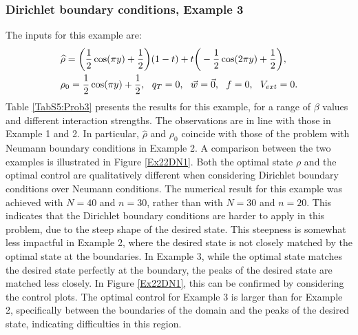 \subsubsection{Dirichlet boundary conditions, Example 3} 
The inputs for this example are:
\begin{align*}
&\widehat \rho = \bigg(\frac{1}{2}\cos(\pi y) + \frac{1}{2}\bigg)(1-t) + t\bigg(-\frac{1}{2}\cos(2 \pi y) + \frac{1}{2}\bigg),\\
&\rho_{0} = \frac{1}{2}\cos(\pi y) + \frac{1}{2},\ \
q_{T} = 0,\ \
\vec{w} = \vec{0},\ \
f =0,\ \
V_{ext} =0.
\end{align*}
Table \ref{TabS5:Prob3} presents the results for this example, for a range of $\beta$ values and different interaction strengths. The observations are in line with those in Example 1 and 2. In particular, $ \widehat \rho$ and $\rho_0$ coincide with those of the problem with Neumann boundary conditions in Example 2. A comparison between the two examples is illustrated in Figure \ref{Ex22DN1}. Both the optimal state $\rho$ and the optimal control are qualitatively different when considering Dirichlet boundary conditions over Neumann conditions. The numerical result for this example was achieved with $N=40$ and $n = 30$, rather than with $N=30$ and $n=20$. This indicates that the Dirichlet boundary conditions are harder to apply in this problem, due to the steep shape of the desired state. This steepness is somewhat less impactful in Example 2, where the desired state is not closely matched by the optimal state at the boundaries. In Example 3, while the optimal state matches the desired state perfectly at the boundary, the peaks of the desired state are matched less closely. In Figure \ref{Ex22DN1}, this can be confirmed by considering the control plots. The optimal control for Example 3 is larger than for Example 2, specifically between the boundaries of the domain and the peaks of the desired state, indicating difficulties in this region.


